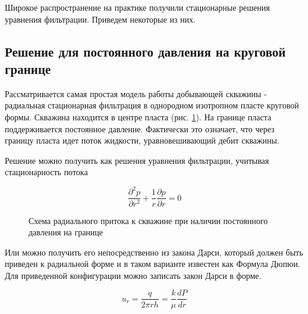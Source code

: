 Широкое распространение на практике получили стационарные решения уравнения фильтрации. Приведем некоторые из них.

\subsection{Решение для постоянного давления на круговой границе}

Рассматривается самая простая модель работы добывающей скважины - радиальная стационарная фильтрация в однородном изотропном пласте круговой формы. Скважина находится в центре пласта (рис. \ref{ris:radial_inflow_steady_state_1}). На границе пласта поддерживается постоянное давление. Фактически это означает, что через границу пласта идет поток жидкости, уравновешивающий дебит скважины. 

Решение можно получить как решения уравнения фильтрации, учитывая стационарность потока

\begin{equation} \label{eq:diff_eq_1} 
	\frac{\partial ^2 p }{\partial r^2} + \frac{1}{r} \frac{\partial p}{\partial r} = 0
\end{equation}

  

\begin{figure}[h!]
	\begin{center}
		
		\caption{Схема радиального притока к скважине при наличии постоянного давления на границе}
		\label{ris:radial_inflow_steady_state_1}
	\end{center}
\end{figure}

Или можно получить его непосредственно из закона Дарси, который должен быть приведен к радиальной форме и в таком варианте известен как Формула Дюпюи.
Для приведенной конфигурации можно записать закон Дарси в форме.

$$u_r=\frac{q}{2\pi rh}=\frac{k}{\mu}\frac{dP}{dr}$$

